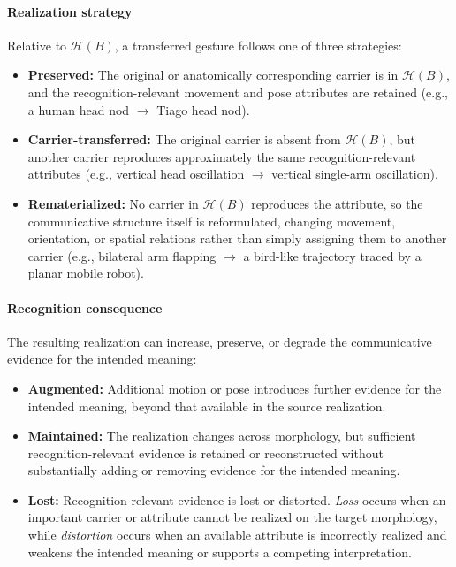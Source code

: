 \documentclass[letterpaper,10pt,conference]{ieeeconf}
\begin{document}
\paragraph{Realization strategy}
Relative to $\mathcal{H}(B)$, a transferred gesture follows one of three strategies:
\begin{itemize}
\item \textbf{Preserved:} The original or anatomically corresponding carrier is in $\mathcal{H}(B)$, and the recognition-relevant movement and pose attributes are retained (e.g., a human head nod $\rightarrow$ Tiago head nod).

\item \textbf{Carrier-transferred:} The original carrier is absent from $\mathcal{H}(B)$, but another carrier reproduces approximately the same recognition-relevant attributes (e.g., vertical head oscillation $\rightarrow$ vertical single-arm oscillation).

\item \textbf{Rematerialized:} No carrier in $\mathcal{H}(B)$ reproduces the attribute, so the communicative structure itself is reformulated, changing movement, orientation, or spatial relations rather than simply assigning them to another carrier (e.g., bilateral arm flapping $\rightarrow$ a bird-like trajectory traced by a planar mobile robot).
\end{itemize}

\paragraph{Recognition consequence}
The resulting realization can increase, preserve, or degrade the communicative evidence for the intended meaning:
\begin{itemize}
\item \textbf{Augmented:} Additional motion or pose introduces further evidence for the intended meaning, beyond that available in the source realization.

\item \textbf{Maintained:} The realization changes across morphology, but sufficient recognition-relevant evidence is retained or reconstructed without substantially adding or removing evidence for the intended meaning.

\item \textbf{Lost:} Recognition-relevant evidence is lost or distorted. \emph{Loss} occurs when an important carrier or attribute cannot be realized on the target morphology, while \emph{distortion} occurs when an available attribute is incorrectly realized and weakens the intended meaning or supports a competing interpretation.
\end{itemize}
\end{document}
